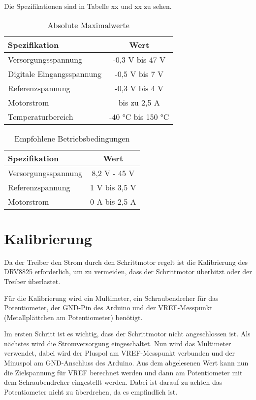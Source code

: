 Die Spezifikationen sind in Tabelle xx und xx zu sehen.

\begin{table}[htpb]
	\centering
	\begin{tabular}{|l|c|}
		\hline
		\textbf{Spezifikation} & \textbf{Wert} \\
		\hline
		Versorgungsspannung & -0,3 V bis 47 V \\
		Digitale Eingangsspannung & -0,5 V bis 7 V \\
		Referenzspannung & -0,3 V bis 4 V \\
		Motorstrom & bis zu 2,5 A \\
		Temperaturbereich & -40 °C bis 150 °C \\
		\hline
	\end{tabular}
	\caption{Absolute Maximalwerte}
	\label{tab:maxSpezifikationDRV8825}
\end{table}

\begin{table}[htpb]
	\centering
	\begin{tabular}{|l|c|}
		\hline
		\textbf{Spezifikation} & \textbf{Wert} \\
		\hline
		Versorgungsspannung & 8,2 V - 45 V \\
		Referenzspannung & 1 V bis 3,5 V \\
		Motorstrom & 0 A bis 2,5 A \\
		\hline
	\end{tabular}
	\caption{Empfohlene Betriebsbedingungen}
	\label{tab:SpezifikationDRV8825}
\end{table}

\section{Kalibrierung}

Da der Treiber den Strom durch den Schrittmotor regelt ist die Kalibrierung des DRV8825 erforderlich, um zu vermeiden, dass der Schrittmotor überhitzt oder der Treiber überlastet. 

Für die Kalibrierung wird ein Multimeter, ein Schraubendreher für das Potentiometer, der GND-Pin des Arduino und der VREF-Messpunkt (Metallplättchen am Potentiometer) benötigt.

Im ersten Schritt ist es wichtig, dass der Schrittmotor nicht angeschlossen ist. Als nächstes wird die Stromversorgung eingeschaltet. Nun wird das Multimeter verwendet, dabei wird der Pluspol am VREF-Messpunkt verbunden und der Minuspol am GND-Anschluss des Arduino. Aus dem abgelesenen Wert kann nun die Zielspannung für VREF berechnet werden und dann am Potentiometer mit dem Schraubendreher eingestellt werden. Dabei ist darauf zu achten das Potentiometer nicht zu überdrehen, da es empfindlich ist. 

